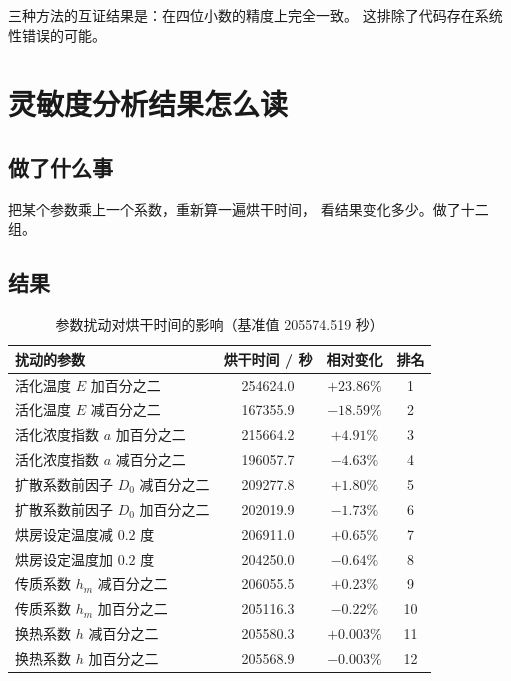 \keypoint
三种方法的互证结果是：在四位小数的精度上完全一致。
这排除了代码存在系统性错误的可能。

\section{灵敏度分析结果怎么读}

\subsection{做了什么事}

把某个参数乘上一个系数，重新算一遍烘干时间，
看结果变化多少。做了十二组。

\subsection{结果}

\begin{table}[H]
\centering
\small
\caption{参数扰动对烘干时间的影响（基准值 205574.519 秒）}
\begin{tabular}{@{}lccc@{}}
\toprule
扰动的参数 & 烘干时间 / 秒 & 相对变化 & 排名 \\
\midrule
活化温度 $E$ 加百分之二 & 254624.0 & $+23.86\%$ & 1 \\
活化温度 $E$ 减百分之二 & 167355.9 & $-18.59\%$ & 2 \\
活化浓度指数 $a$ 加百分之二 & 215664.2 & $+4.91\%$ & 3 \\
活化浓度指数 $a$ 减百分之二 & 196057.7 & $-4.63\%$ & 4 \\
扩散系数前因子 $D_0$ 减百分之二 & 209277.8 & $+1.80\%$ & 5 \\
扩散系数前因子 $D_0$ 加百分之二 & 202019.9 & $-1.73\%$ & 6 \\
烘房设定温度减 $0.2$ 度 & 206911.0 & $+0.65\%$ & 7 \\
烘房设定温度加 $0.2$ 度 & 204250.0 & $-0.64\%$ & 8 \\
传质系数 $h_m$ 减百分之二 & 206055.5 & $+0.23\%$ & 9 \\
传质系数 $h_m$ 加百分之二 & 205116.3 & $-0.22\%$ & 10 \\
换热系数 $h$ 减百分之二 & 205580.3 & $+0.003\%$ & 11 \\
换热系数 $h$ 加百分之二 & 205568.9 & $-0.003\%$ & 12 \\
\bottomrule
\end{tabular}
\end{table}

